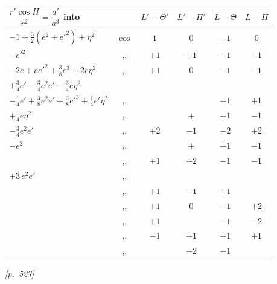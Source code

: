 \documentclass[11pt]{article}
\begin{document}
\medskip

\begin{center}
\begin{tabular}{|l|c|c|c|c|c|}
\hline
$\dfrac{r'\cos H}{r^2}=\dfrac{a'}{a^3}$ into & & $L'-\Theta'$ & $L'-\Pi'$ & $L-\Theta$ & $L-\Pi$ \\
\hline
$-1+\tfrac{3}{2}(e^2+e'^2)+\eta^2$ & $\cos$ & $1$ & $0$ & $-1$ & $0$ \\
$-e'^2$ & ,, & $+1$ & $+1$ & $-1$ & $-1$ \\
$-2e+ee'^2+\tfrac{3}{8}e^3+2e\eta^2$ & ,, & $+1$ & $0$ & $-1$ & $-1$ \\
$+\tfrac{3}{4}e'-\tfrac{3}{4}e^2e'-\tfrac{3}{4}e\eta^2$ & & & & & \\
$-\tfrac{1}{4}e'+\tfrac{3}{8}e^2e'+\tfrac{3}{8}e'^3+\tfrac{1}{4}e'\eta^2$ & ,, & & & $+1$ & $+1$ \\
$+\tfrac{1}{4}e\eta^2$ & ,, & & $+$ & $+1$ & $-1$ \\
$-\tfrac{3}{4}e^2e'$ & ,, & $+2$ & $-1$ & $-2$ & $+2$ \\
$-e^2$ & ,, & & $+$ & $+1$ & $-1$ \\
 & ,, & $+1$ & $+2$ & $-1$ & $-1$ \\
$+3\,e^2e'$ & ,, & & & & \\
 & ,, & $+1$ & $-1$ & $+1$ & \\
 & ,, & $+1$ & $0$ & $-1$ & $+2$ \\
 & ,, & $+1$ & & $-1$ & $-2$ \\
 & ,, & $-1$ & $+1$ & $+1$ & $+1$ \\
 & ,, & & $+2$ & $+1$ & \\
\hline
\end{tabular}
\end{center}


\newpage
\noindent\textit{[p.~527]}

\medskip
\end{document}
